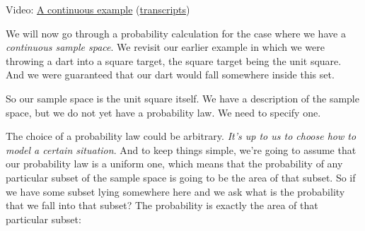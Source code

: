 \documentclass[pdftex, brazil, 12pt, twoside]{article}
\begin{document}
Video: \href{https://www.youtube.com/watch?v=sT3xw1TZ7oU}{A continuous example}
(\href{Unit-1/01\_lecture\_1\_probability\_models\_and\_axioms/l01\_7\_transcripts.pdf}{transcripts})

We will now go through a probability calculation for
the case where we have a \emph{continuous sample space}.
We revisit our earlier example in which we were throwing a
dart into a square target, the square target
being the unit square.
And we were guaranteed that our dart would fall somewhere
inside this set.

\begin{figure}[H]
  \begin{center}
  \end{center}
\end{figure}

So our sample space is the unit square itself.
We have a description of the sample space, but we do not
yet have a probability law.
We need to specify one.

The choice of a probability law could be arbitrary.
\emph{It's up to us to choose how to model a certain situation}.
And to keep things simple, we're going to assume that our
probability law is a uniform one, which means that the
probability of any particular subset of the sample space is
going to be the area of that subset.
So if we have some subset lying somewhere here and we
ask what is the probability that we fall into that subset?
The probability is exactly the area of
that particular subset:

\begin{figure}[H]
  \begin{center}
  \end{center}
\end{figure}
\end{document}
